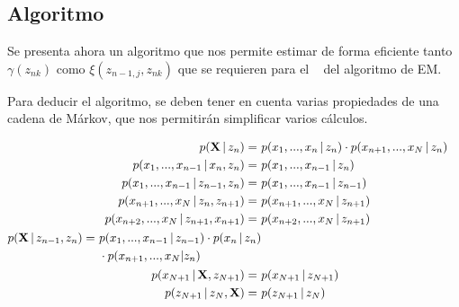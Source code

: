 \subsection{Algoritmo \abf}

Se presenta ahora un algoritmo que nos permite estimar de forma eficiente tanto $\gamma(z_{nk})$ como $\xi(z_{n-1, j}, z_{nk})$ que se requieren para el \estep~ del algoritmo de \ac{EM}.

Para deducir el algoritmo, se deben tener en cuenta varias propiedades de una cadena de Márkov, que nos permitirán simplificar varios cálculos. 


\hspace{-.2\textwidth}
\begin{minipage}{1.25\textwidth}
\begin{align}
p(\textbf{X} \,|\, z_n) =~ &p(x_1, ..., x_n \,|\, z_n) 
  \cdot p(x_{n+1}, ..., x_N \,|\, z_n) \label{eqn:3-10} &\\
p(x_1, ..., x_{n-1} \,|\, x_n, z_n) =~ 
  &p(x_1, ..., x_{n-1} \,|\, z_n) 
\label{eqn:3-11} &\\
p(x_1, ..., x_{n-1} \,|\, z_{n-1}, z_n) =~ 
  &p(x_1, ..., x_{n-1} \,|\, z_{n-1}) 
\label{eqn:3-12} &\\
p(x_{n+1}, ..., x_N \,|\, z_n, z_{n+1}) =~ 
  &p(x_{n+1}, ..., x_N \,|\, z_{n+1}) 
\label{eqn:3-13} &\\
p(x_{n+2}, ..., x_N \,|\, z_{n+1}, x_{n+1}) =~ 
  &p(x_{n+2}, ..., x_N \,|\, z_{n+1})
\label{eqn:3-14} &\\ 
\begin{split}
  p(\textbf{X} \,|\, z_{n-1}, z_n) =~ &p(x_1, ..., x_{n-1} \,|\, z_{n-1}) \cdot
  p(x_n \,|\, z_n) \\ &\cdot p(x_{n+1}, ..., x_N | z_n)
\end{split} \label{eqn:3-15} &\\
  p(x_{N+1} \,|\, \textbf{X} ,z_{N+1}) =~ &p(x_{N+1} \,|\, z_{N+1}) 
\label{eqn:3-16} &\\
p(z_{N+1} \,|\, z_N, \textbf{X}) =~ &p(z_{N+1} \,|\, z_N) 
\label{eqn:3-17} &\\
\end{align}
\end{minipage}

